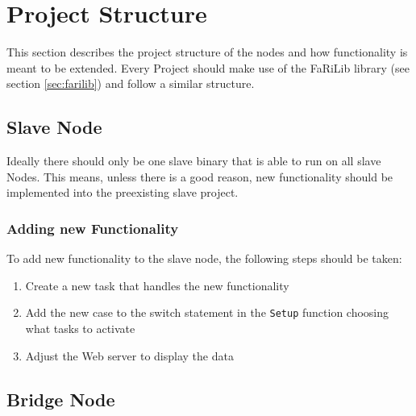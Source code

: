 \section{Project Structure} \label{sec:node_project_structure}

This section describes the project structure of the nodes
and how functionality is meant to be extended. Every Project
should make use of the FaRiLib library (see section \ref{sec:farilib})
and follow a similar structure.

    \subsection{Slave Node}
    Ideally there should only be one slave binary that is able to 
    run on all slave Nodes. This means, unless there is a good 
    reason, new functionality should be implemented into the preexisting
    slave project.
        \subsubsection{Adding new Functionality}
        To add new functionality to the slave node, the following steps
        should be taken:
        \begin{enumerate}
            \item Create a new task that handles the new functionality
            \item Add the new case to the switch statement in the
            \texttt{Setup} function choosing what tasks to activate
            \item Adjust the Web server to display the data
        \end{enumerate}
    \subsection{Bridge Node}